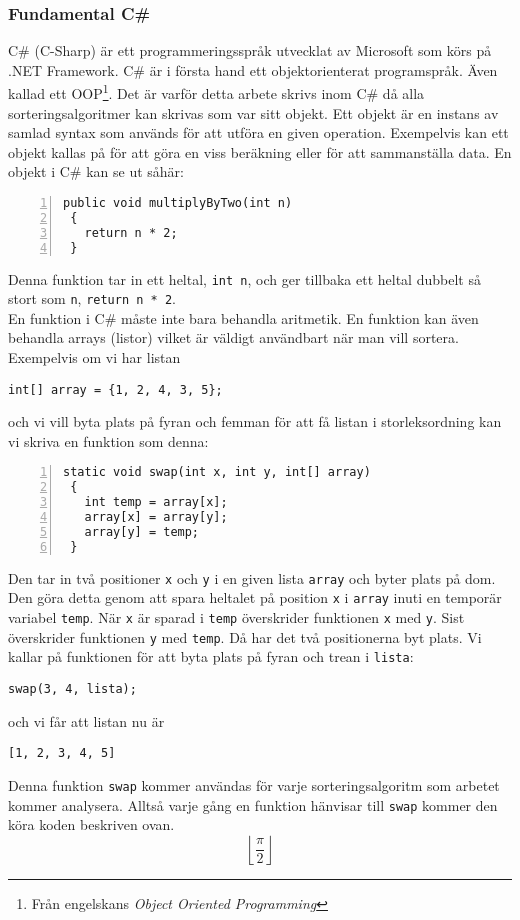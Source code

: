 \documentclass[twocolumn, a4, twoside]{article}
\begin{document}
\subsubsection{Fundamental C\#}
C\# (C-Sharp) är ett programmeringsspråk utvecklat av Microsoft som körs på .NET Framework. \cite{7} C\# är i första hand ett objektorienterat programspråk. Även kallad ett OOP\footnote{Från engelskans \textit{Object Oriented Programming}}. Det är varför detta arbete skrivs inom C\# då alla sorteringsalgoritmer kan skrivas som var sitt objekt. Ett objekt är en instans av samlad syntax som används för att utföra en given operation. Exempelvis kan ett objekt kallas på för att göra en viss beräkning eller för att sammanställa data. En objekt i C\# kan se ut såhär:
\begin{lstlisting}[style=mystyle, numbers=left]
 public void multiplyByTwo(int n)
 {
   return n * 2;
 }
\end{lstlisting}
Denna funktion tar in ett heltal, \lstinline{int n}, och ger tillbaka ett heltal dubbelt så stort som \lstinline{n}, \lstinline{return n * 2}.\\
En funktion i C\# måste inte bara behandla aritmetik. En funktion kan även behandla arrays (listor) vilket är väldigt användbart när man vill sortera. Exempelvis om vi har listan
\begin{lstlisting}[style=mystyle, numbers=none]
 int[] array = {1, 2, 4, 3, 5};
\end{lstlisting}
och vi vill byta plats på fyran och femman för att få listan i storleksordning kan vi skriva en funktion som denna:
\begin{lstlisting}[style=mystyle, numbers=left]
 static void swap(int x, int y, int[] array)
 {
   int temp = array[x];
   array[x] = array[y];
   array[y] = temp;
 }
\end{lstlisting}
Den tar in två positioner \lstinline{x} och \lstinline{y} i en given lista \lstinline{array} och byter plats på dom. Den göra detta genom att spara heltalet på position \lstinline{x} i \lstinline{array} inuti en temporär variabel \lstinline{temp}. När \lstinline{x} är sparad i \lstinline{temp} överskrider funktionen \lstinline{x} med \lstinline{y}. Sist överskrider funktionen \lstinline{y} med \lstinline{temp}. Då har det två positionerna byt plats. Vi kallar på funktionen för att byta plats på fyran och trean i \lstinline{lista}:
\begin{lstlisting}[style=mystyle, numbers=none]
 swap(3, 4, lista);
\end{lstlisting}
och vi får att listan nu är 
\begin{lstlisting}[style=mystyle, numbers=none]
 [1, 2, 3, 4, 5]
\end{lstlisting}
Denna funktion \lstinline{swap} kommer användas för varje sorteringsalgoritm som arbetet kommer analysera. Alltså varje gång en funktion hänvisar till \lstinline{swap} kommer den köra koden beskriven ovan.
\begin{equation*}
    \left\lfloor\frac{\pi}{2}\right\rfloor 
\end{equation*}
\end{document}
